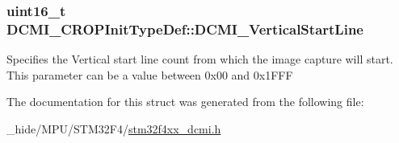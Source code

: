 \subsubsection[{D\+C\+M\+I\+\_\+\+Vertical\+Start\+Line}]{\setlength{\rightskip}{0pt plus 5cm}uint16\+\_\+t D\+C\+M\+I\+\_\+\+C\+R\+O\+P\+Init\+Type\+Def\+::\+D\+C\+M\+I\+\_\+\+Vertical\+Start\+Line}\label{struct_d_c_m_i___c_r_o_p_init_type_def_a4d4f4ef4975179f025d3cde589e380fe}
Specifies the Vertical start line count from which the image capture will start. This parameter can be a value between 0x00 and 0x1\+F\+F\+F 

The documentation for this struct was generated from the following file\+:\begin{DoxyCompactItemize}
\item 
\+\_\+hide/\+M\+P\+U/\+S\+T\+M32\+F4/\hyperlink{stm32f4xx__dcmi_8h}{stm32f4xx\+\_\+dcmi.\+h}\end{DoxyCompactItemize}
